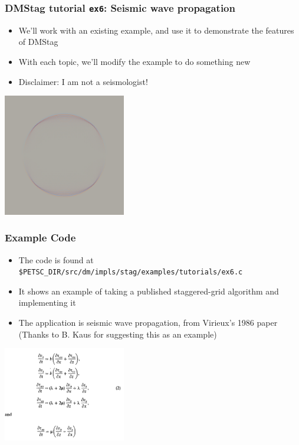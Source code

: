\documentclass{beamer}
\begin{document}
\begin{frame}[fragile]
\frametitle{DMStag tutorial \texttt{ex6}: Seismic wave propagation}
\begin{itemize}
\item We'll work with an existing example, and use it to demonstrate the features of DMStag
\item With each topic, we'll modify the example to do something new
\item Disclaimer: I am not a seismologist!
\end{itemize}
\begin{center}
\includegraphics[width=0.4\textwidth]{images/dmstag_ex6_yvel_485.png}
\end{center}
\end{frame}

\begin{frame}[fragile]
\frametitle{Example Code}
  \begin{itemize}
    \item The code is found at \lstinline{$PETSC_DIR/src/dm/impls/stag/examples/tutorials/ex6.c}
      \item It shows an example of taking a published staggered-grid algorithm and implementing it
      \item The application is seismic wave propagation, from Virieux's 1986 paper  (Thanks to B. Kaus for suggesting this as an example)
  \end{itemize}
  \begin{center}
  \includegraphics[width=0.4\textwidth]{images/virieux1986_eq2.png}
  \end{center}
\end{frame}
\end{document}
